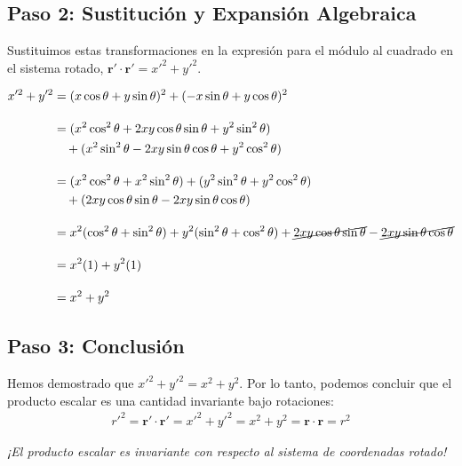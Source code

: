 \documentclass[11pt,a4paper]{book}
\begin{document}
\subsection*{Paso 2: Sustitución y Expansión Algebraica}
Sustituimos estas transformaciones en la expresión para el módulo al cuadrado en el sistema rotado, $\boldsymbol{r}' \cdot \boldsymbol{r}' = x'^2 + y'^2$.

\begin{align*}
    x'^2 + y'^2 &= (x \cos\theta + y \sin\theta)^2 + (-x \sin\theta + y \cos\theta)^2 \\[1em]
    &= (x^2 \cos^2\theta + 2xy \cos\theta \sin\theta + y^2 \sin^2\theta) \\
    &\quad + (x^2 \sin^2\theta - 2xy \sin\theta \cos\theta + y^2 \cos^2\theta) \\[1em]
    &= (x^2 \cos^2\theta + x^2 \sin^2\theta) + (y^2 \sin^2\theta + y^2 \cos^2\theta) \\
    &\quad + (2xy \cos\theta \sin\theta - 2xy \sin\theta \cos\theta) \\[1em]
    &= x^2(\cos^2\theta + \sin^2\theta) + y^2(\sin^2\theta + \cos^2\theta) + \cancel{2xy \cos\theta \sin\theta} - \cancel{2xy \sin\theta \cos\theta} \\[1em]
    &= x^2(1) + y^2(1) \\[1em]
    &= x^2 + y^2
\end{align*}

\subsection*{Paso 3: Conclusión}
Hemos demostrado que $x'^2 + y'^2 = x^2 + y^2$. Por lo tanto, podemos concluir que el producto escalar es una cantidad invariante bajo rotaciones:
\begin{align}
\label{eq:so3}
    \boxed{
{r'}^2=\boldsymbol{r}' \cdot \boldsymbol{r}' = x'^2 + y'^2 = x^2 + y^2 = \boldsymbol{r} \cdot \boldsymbol{r} = r^2
}
\end{align}


\vspace{1em} %
\noindent %
\textit{¡El producto escalar es invariante con respecto al sistema de coordenadas rotado!}
\end{document}
